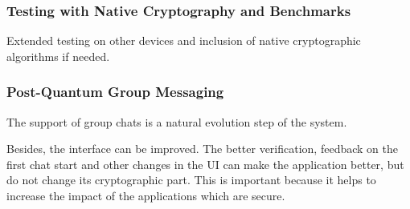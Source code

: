 \subsubsection{Testing with Native Cryptography and Benchmarks}
Extended testing on other devices and inclusion of native cryptographic algorithms if needed.

\subsubsection{Post-Quantum Group Messaging}
The support of group chats is a natural evolution step of the system.

Besides, the interface can be improved. The better verification, feedback on the first chat start and other changes in the UI can make the application better, but do not change its cryptographic part. This is important because it helps to increase the impact of the applications which are secure.